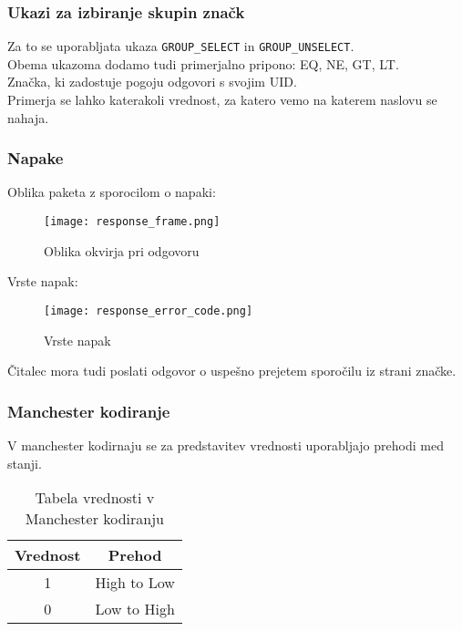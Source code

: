 \documentclass[]{article}
\begin{document}
\subsubsection{Ukazi za izbiranje skupin zna\v{c}k}
Za to se uporabljata ukaza \texttt{GROUP\_SELECT} in
\texttt{GROUP\_UNSELECT}. \\
Obema ukazoma dodamo tudi primerjalno pripono: EQ, NE, GT, LT. \\
Zna\v{c}ka, ki zadostuje pogoju odgovori s svojim UID. \\
Primerja se lahko katerakoli vrednost, za katero vemo na katerem
naslovu se nahaja. 

\subsubsection{Napake}
Oblika paketa z sporocilom o napaki:
\begin{figure}[H] %
  \centering
  \texttt{[image: response\_frame.png]}
  \caption{Oblika okvirja pri odgovoru}
\end{figure}

Vrste napak:
\begin{figure}[H] %
  \centering
  \texttt{[image: response\_error\_code.png]}
  \caption{Vrste napak}
\end{figure}

\v{C}italec mora tudi poslati odgovor o uspe\v{s}no prejetem
sporo\v{c}ilu iz strani zna\v{c}ke.

\subsubsection{Manchester kodiranje}

V manchester kodirnaju se za predstavitev vrednosti uporabljajo
prehodi med stanji.

\begin{table}[H] %
  \begin{center}
    \begin{tabular}{c | c}
      Vrednost & Prehod \\
      \hline
      1 & High to Low \\
      0 & Low to High \\
    \end{tabular}
  \end{center}
  \caption{Tabela vrednosti v Manchester kodiranju}
\end{table}
\end{document}
